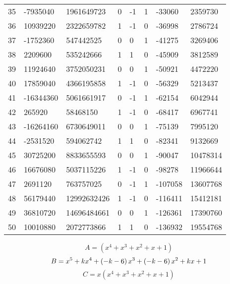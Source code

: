 \documentclass{amsart}
\begin{document}
\begin{longtable}{|l|l|l|lllll|}
35&-7935040&1961649723&0&-1&1&-33060&2359730\\
36&10939220&2322659782&1&-1&0&-36998&2786724\\
37&-1752360&547442525&0&0&1&-41275&3269406\\
38&2209600&535242666&1&1&0&-45909&3812589\\
39&11924640&3752050231&0&0&1&-50921&4472220\\
40&17859040&4366195858&1&-1&0&-56329&5213437\\
41&-16344360&5061661917&0&-1&1&-62154&6042944\\
42&265920&58468150&1&-1&0&-68417&6967741\\
43&-16264160&6730649011&0&0&1&-75139&7995120\\
44&-2531520&594062742&1&1&0&-82341&9132669\\
45&30725200&8833655593&0&0&1&-90047&10478314\\
46&16676080&5037115226&1&-1&0&-98278&11966644\\
47&2691120&763757025&0&-1&1&-107058&13607768\\
48&56179440&12992632426&1&-1&0&-116411&15412181\\
49&36810720&14696484661&0&0&1&-126361&17390760\\
50&10010880&2072773866&1&1&0&-136932&19554768\\
\hline
\end{longtable}
$$A=(x^4
 + x^3
 + x^2
 + x
 + 1)$$
$$B=x^5
 + k\*x^4
 + \left(-k
 - 6\right) \*x^3
 + \left(-k
 - 6\right) \*x^2
 + k\*x
 + 1$$
$$C=x(x^4
 + x^3
 + x^2
 + x
 + 1)$$
\end{document}
